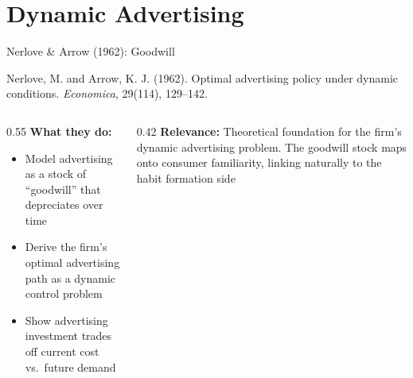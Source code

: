 \documentclass[aspectratio=169,professionalfonts]{beamer}
\newcommand{\hl}[1]{\textbf{\textcolor{UGARed}{#1}}}
\begin{document}
\section{Dynamic Advertising}

\begin{frame}{Nerlove \& Arrow (1962): Goodwill}
  \begin{tcolorbox}[colback=red!5!white, colframe=UGARed, title=\textbf{Citation}]
    Nerlove, M. and Arrow, K. J. (1962). Optimal advertising policy under dynamic
    conditions. \textit{Economica}, 29(114), 129--142.
  \end{tcolorbox}
  \vspace{6pt}
  \begin{columns}[T]
    \begin{column}{0.55\textwidth}
      \hl{What they do:}
      \begin{itemize}
        \item Model advertising as a stock of ``goodwill'' that depreciates over time
        \item Derive the firm's optimal advertising path as a dynamic control problem
        \item Show advertising investment trades off current cost vs.\ future demand
      \end{itemize}
    \end{column}
    \begin{column}{0.42\textwidth}
      \hl{Relevance:} Theoretical foundation for the firm's dynamic advertising problem.
      The goodwill stock maps onto consumer familiarity, linking naturally to the
      habit formation side
    \end{column}
  \end{columns}
\end{frame}
\end{document}
